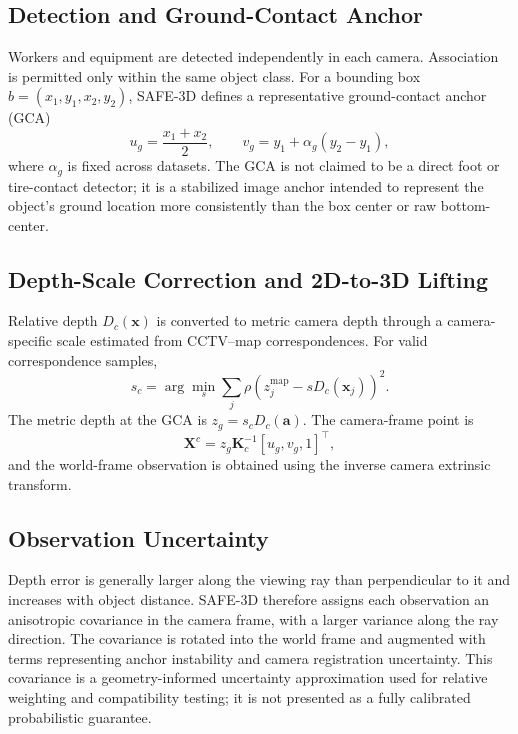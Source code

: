 \subsection{Detection and Ground-Contact Anchor}
Workers and equipment are detected independently in each camera. Association is permitted only within the same object class. For a bounding box $b=(x_1,y_1,x_2,y_2)$, SAFE-3D defines a representative ground-contact anchor (GCA)
\begin{equation}
u_g=\frac{x_1+x_2}{2},\qquad v_g=y_1+\alpha_g(y_2-y_1),
\end{equation}
where $\alpha_g$ is fixed across datasets. The GCA is not claimed to be a direct foot or tire-contact detector; it is a stabilized image anchor intended to represent the object's ground location more consistently than the box center or raw bottom-center.

\subsection{Depth-Scale Correction and 2D-to-3D Lifting}
Relative depth $D_c(\mathbf{x})$ is converted to metric camera depth through a camera-specific scale estimated from CCTV--map correspondences. For valid correspondence samples,
\begin{equation}
s_c=\arg\min_s\sum_j\rho\left(z_{j}^{\mathrm{map}}-sD_c(\mathbf{x}_j)\right)^2.
\end{equation}
The metric depth at the GCA is $z_g=s_cD_c(\mathbf{a})$. The camera-frame point is
\begin{equation}
\mathbf{X}^{c}=z_g\mathbf{K}_c^{-1}[u_g,v_g,1]^\top,
\end{equation}
and the world-frame observation is obtained using the inverse camera extrinsic transform.

\subsection{Observation Uncertainty}
Depth error is generally larger along the viewing ray than perpendicular to it and increases with object distance. SAFE-3D therefore assigns each observation an anisotropic covariance in the camera frame, with a larger variance along the ray direction. The covariance is rotated into the world frame and augmented with terms representing anchor instability and camera registration uncertainty. This covariance is a geometry-informed uncertainty approximation used for relative weighting and compatibility testing; it is not presented as a fully calibrated probabilistic guarantee.

